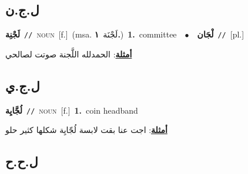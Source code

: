 \documentclass[10pt,a4paper,twoside]{article} %
\begin{document}
\begin{multicols}{2}
\vspace{-3mm}
\subsection*{\color{blue}\foreignlanguage{arabic}{ل.ج.ن}\color{blue}{}} 

{\setlength\topsep{0pt}\textbf{\foreignlanguage{arabic}{لَجْنِة}}\ {\color{gray}\texttt{//}\color{black}}\ \textsc{noun}\ [f.]\ \color{gray}(msa. \foreignlanguage{arabic}{لَجْنَة}~\foreignlanguage{arabic}{\textbf{١.}})\color{black}\ \textbf{1.}~committee\ \ $\bullet$\ \ \setlength\topsep{0pt}\textbf{\foreignlanguage{arabic}{لْجَان}}\ {\color{gray}\texttt{//}\color{black}}\ [pl.]\  \begin{flushright}\color{gray}\foreignlanguage{arabic}{\textbf{\underline{\foreignlanguage{arabic}{أمثلة}}}: الحمدلله اللَّجنة صوتت لصالحي}\end{flushright}\color{black}} \vspace{2mm}

\vspace{-3mm}
\subsection*{\color{blue}\foreignlanguage{arabic}{ل.ج.ي}\color{blue}{}} 

{\setlength\topsep{0pt}\textbf{\foreignlanguage{arabic}{لُجَّايِة}}\ {\color{gray}\texttt{//}\color{black}}\ \textsc{noun}\ [f.]\ \textbf{1.}~coin headband\  \begin{flushright}\color{gray}\foreignlanguage{arabic}{\textbf{\underline{\foreignlanguage{arabic}{أمثلة}}}: اجت عنا بقت لابسة لُجّايِة شكلها كثير حلو}\end{flushright}\color{black}} \vspace{2mm}

\vspace{-3mm}
\subsection*{\color{blue}\foreignlanguage{arabic}{ل.ح.ح}\color{blue}{}} 


\end{multicols}
\end{document}
